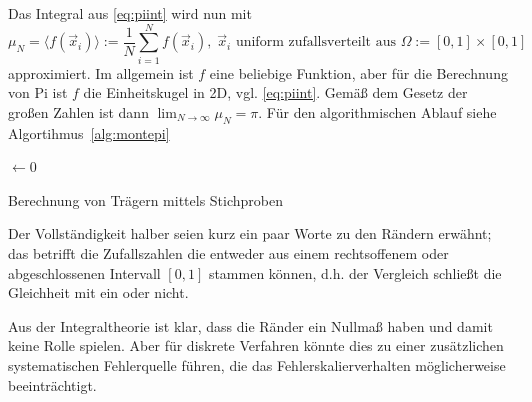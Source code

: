 Das Integral aus \autoref{eq:piint} wird nun mit
\begin{equation}
	\label{eq:pimonteint}
	\mu_N = \langle f\left( \vec{x}_i \right) \rangle := \frac{1}{N} \sum_{i=1}^N f\left( \vec{x}_i \right),\;\vec{x}_i \text{ uniform zufallsverteilt aus } \Omega:=[0,1]\times[0,1]
\end{equation}
approximiert. Im allgemein ist $f$ eine beliebige Funktion, aber für die Berechnung von Pi ist $f$ die Einheitskugel in 2D, vgl. \autoref{eq:piint}. Gemäß dem Gesetz der großen Zahlen ist dann $\lim_{N\rightarrow \infty} \mu_N = \pi$. Für den algorithmischen Ablauf siehe Algortihmus~\ref{alg:montepi}

\begin{algorithm}
    \DontPrintSemicolon
    \BlankLine
    \sum$\leftarrow 0$\;
    \caption{Berechnung von Trägern mittels Stichproben}
    \label{alg:montepi}
\end{algorithm}


Der Vollständigkeit halber seien kurz ein paar Worte zu den Rändern erwähnt; das betrifft die Zufallszahlen die entweder aus einem rechtsoffenem oder abgeschlossenen Intervall $[0,1]$ stammen können, d.h. der Vergleich schließt die Gleichheit mit ein oder nicht.

Aus der Integraltheorie ist klar, dass die Ränder ein Nullmaß haben und damit keine Rolle spielen. Aber für diskrete Verfahren könnte dies zu einer zusätzlichen systematischen Fehlerquelle führen, die das Fehlerskalierverhalten möglicherweise beeinträchtigt.

